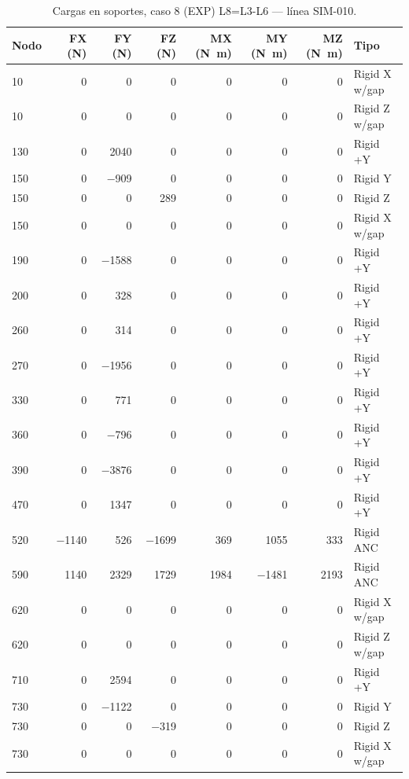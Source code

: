 \begin{table}[htbp]
  \centering
  \footnotesize
  \caption{Cargas en soportes, caso 8 (EXP) L8=L3-L6 — línea SIM-010.}
  \label{tab:restricciones-exp}
  \begin{tabular}{lrrrrrrl}
    \toprule
    Nodo & FX (\si{N}) & FY (\si{N}) & FZ (\si{N}) & MX (\si{N.m}) & MY (\si{N.m}) & MZ (\si{N.m}) & Tipo \\
    \midrule
    10 & \num{0} & \num{0} & \num{0} & \num{0} & \num{0} & \num{0} & Rigid X w/gap \\
    10 & \num{0} & \num{0} & \num{0} & \num{0} & \num{0} & \num{0} & Rigid Z w/gap \\
    130 & \num{0} & \num{2040} & \num{0} & \num{0} & \num{0} & \num{0} & Rigid +Y \\
    150 & \num{0} & \num{-909} & \num{0} & \num{0} & \num{0} & \num{0} & Rigid Y \\
    150 & \num{0} & \num{0} & \num{289} & \num{0} & \num{0} & \num{0} & Rigid Z \\
    150 & \num{0} & \num{0} & \num{0} & \num{0} & \num{0} & \num{0} & Rigid X w/gap \\
    190 & \num{0} & \num{-1588} & \num{0} & \num{0} & \num{0} & \num{0} & Rigid +Y \\
    200 & \num{0} & \num{328} & \num{0} & \num{0} & \num{0} & \num{0} & Rigid +Y \\
    260 & \num{0} & \num{314} & \num{0} & \num{0} & \num{0} & \num{0} & Rigid +Y \\
    270 & \num{0} & \num{-1956} & \num{0} & \num{0} & \num{0} & \num{0} & Rigid +Y \\
    330 & \num{0} & \num{771} & \num{0} & \num{0} & \num{0} & \num{0} & Rigid +Y \\
    360 & \num{0} & \num{-796} & \num{0} & \num{0} & \num{0} & \num{0} & Rigid +Y \\
    390 & \num{0} & \num{-3876} & \num{0} & \num{0} & \num{0} & \num{0} & Rigid +Y \\
    470 & \num{0} & \num{1347} & \num{0} & \num{0} & \num{0} & \num{0} & Rigid +Y \\
    520 & \num{-1140} & \num{526} & \num{-1699} & \num{369} & \num{1055} & \num{333} & Rigid ANC \\
    590 & \num{1140} & \num{2329} & \num{1729} & \num{1984} & \num{-1481} & \num{2193} & Rigid ANC \\
    620 & \num{0} & \num{0} & \num{0} & \num{0} & \num{0} & \num{0} & Rigid X w/gap \\
    620 & \num{0} & \num{0} & \num{0} & \num{0} & \num{0} & \num{0} & Rigid Z w/gap \\
    710 & \num{0} & \num{2594} & \num{0} & \num{0} & \num{0} & \num{0} & Rigid +Y \\
    730 & \num{0} & \num{-1122} & \num{0} & \num{0} & \num{0} & \num{0} & Rigid Y \\
    730 & \num{0} & \num{0} & \num{-319} & \num{0} & \num{0} & \num{0} & Rigid Z \\
    730 & \num{0} & \num{0} & \num{0} & \num{0} & \num{0} & \num{0} & Rigid X w/gap \\
    \bottomrule
  \end{tabular}
\end{table}
